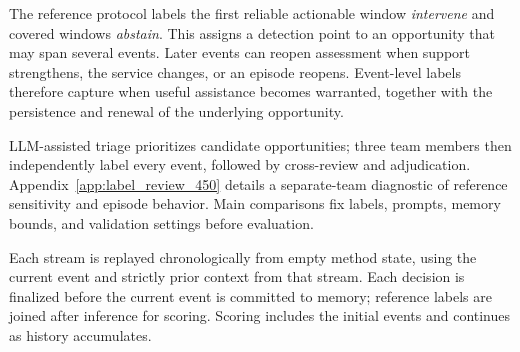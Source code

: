 The reference protocol labels the first reliable actionable window \emph{intervene} and covered windows \emph{abstain}.
This assigns a detection point to an opportunity that may span several events.
Later events can reopen assessment when support strengthens, the service changes, or an episode reopens.
Event-level labels therefore capture when useful assistance becomes warranted, together with the persistence and renewal of the underlying opportunity.

LLM-assisted triage prioritizes candidate opportunities; three team members then independently label every event, followed by cross-review and adjudication.
Appendix~\ref{app:label_review_450} details a separate-team diagnostic of reference sensitivity and episode behavior.
Main comparisons fix labels, prompts, memory bounds, and validation settings before evaluation.

Each stream is replayed chronologically from empty method state, using the current event and strictly prior context from that stream.
Each decision is finalized before the current event is committed to memory; reference labels are joined after inference for scoring.
Scoring includes the initial events and continues as history accumulates.
